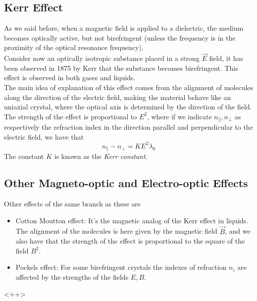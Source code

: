 \documentclass[../electromagnetism.tex]{subfiles}
\begin{document}
\subsection{Kerr Effect}
As we said before, when a magnetic field is applied to a dielectric, the medium becomes optically active, but not birefringent (unless the frequency is in the proximity of the optical resonance frequency).\\
Consider now an optically isotropic substance placed in a strong $\vec{E}$ field, it has been observed in 1875 by Kerr that the substance becomes birefringent. This effect is observed in both gases and liquids.\\
The main idea of explanation of this effect comes from the alignment of molecules along the direction of the electric field, making the material behave like an uniaxial crystal, where the optical axis is determined by the direction of the field.\\
The strength of the effect is proportional to $E^2$, where if we indicate $n_{\parallel}, n_{\perp}$ as respectively the refraction index in the direction parallel and perpendicular to the electric field, we have that
\begin{equation}
	n_{\parallel}-n_{\perp}=KE^2\lambda_0
	\label{eq:kerreffect.eop}
\end{equation}
The constant $K$ is known as the \textit{Kerr constant}.
\subsection{Other Magneto-optic and Electro-optic Effects}
Other effects of the same branch as these are
\begin{itemize}
\item Cotton Moutton effect: It's the magnetic analog of the Kerr effect in liquids. The alignment of the molecules is here given by the magnetic field $\vec{B}$, and we also have that the strength of the effect is proportional to the square of the field $B^2$.
\item Pockels effect: For some birefringent crystals the indexes of refraction $n_i$ are affected by the strengths of the fields $E, B$.
\end{itemize}
<++>
\end{document}
